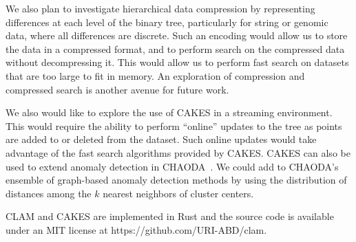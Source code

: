 We also plan to investigate hierarchical data compression by representing differences at each level of the binary tree, particularly for string or genomic data, where all differences are discrete.
Such an encoding would allow us to store the data in a compressed format, and to perform search on the compressed data without decompressing it.
This would allow us to perform fast search on datasets that are too large to fit in memory.
An exploration of compression and compressed search is another avenue for future work.

We also would like to explore the use of CAKES in a streaming environment.
This would require the ability to perform ``online'' updates to the tree as points are added to or deleted from the dataset.
Such online updates would take advantage of the fast search algorithms provided by CAKES.  %
CAKES can also be used to extend anomaly detection in CHAODA~\cite{ishaq2021clustered}.
We could add to CHAODA's ensemble of graph-based anomaly detection methods by using the distribution of distances among the $k$ nearest neighbors of cluster centers.

CLAM and CAKES are implemented in Rust and the source code is available under an MIT license at https://github.com/URI-ABD/clam.
